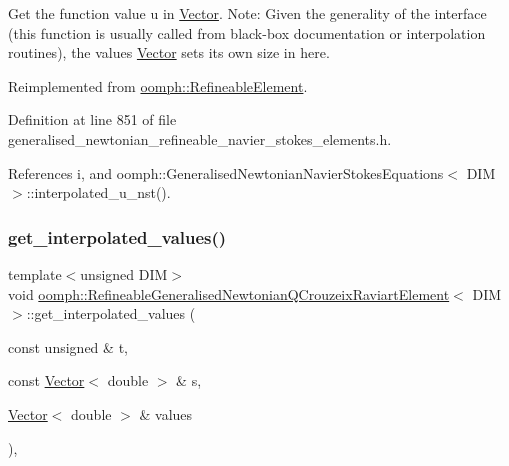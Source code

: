 Get the function value u in \hyperlink{classoomph_1_1Vector}{Vector}. Note\+: Given the generality of the interface (this function is usually called from black-\/box documentation or interpolation routines), the values \hyperlink{classoomph_1_1Vector}{Vector} sets its own size in here. 



Reimplemented from \hyperlink{classoomph_1_1RefineableElement_ad9a4f92880668a2373326d8306365c43}{oomph\+::\+Refineable\+Element}.



Definition at line 851 of file generalised\+\_\+newtonian\+\_\+refineable\+\_\+navier\+\_\+stokes\+\_\+elements.\+h.



References i, and oomph\+::\+Generalised\+Newtonian\+Navier\+Stokes\+Equations$<$ D\+I\+M $>$\+::interpolated\+\_\+u\+\_\+nst().

\mbox{\label{classoomph_1_1RefineableGeneralisedNewtonianQCrouzeixRaviartElement_a6cbe5e87cd25badfbe4a83b853a8055d}} 
\subsubsection{\texorpdfstring{get\+\_\+interpolated\+\_\+values()}{get\_interpolated\_values()}\hspace{0.1cm}{\footnotesize\ttfamily [2/2]}}
{\footnotesize\ttfamily template$<$unsigned D\+IM$>$ \\
void \hyperlink{classoomph_1_1RefineableGeneralisedNewtonianQCrouzeixRaviartElement}{oomph\+::\+Refineable\+Generalised\+Newtonian\+Q\+Crouzeix\+Raviart\+Element}$<$ D\+IM $>$\+::get\+\_\+interpolated\+\_\+values (\begin{DoxyParamCaption}\item[{const unsigned \&}]{t,  }\item[{const \hyperlink{classoomph_1_1Vector}{Vector}$<$ double $>$ \&}]{s,  }\item[{\hyperlink{classoomph_1_1Vector}{Vector}$<$ double $>$ \&}]{values }\end{DoxyParamCaption})\hspace{0.3cm}{\ttfamily [inline]}, {\ttfamily [virtual]}}



